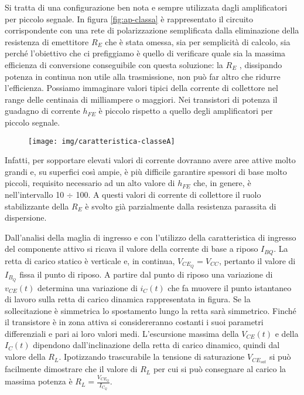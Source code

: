Si tratta di una configurazione ben nota e sempre utilizzata dagli amplificatori per piccolo segnale.
In figura \ref{fig:ap-classa} è rappresentato il circuito corrispondente con una rete di polarizzazione	semplificata dalla eliminazione della resistenza di emettitore $R_E$ che è stata omessa, sia per
semplicità di calcolo, sia perché l'obiettivo che ci prefiggiamo è quello di verificare quale sia la
massima efficienza di conversione conseguibile con questa soluzione: la $R_E$ , dissipando potenza in
continua non utile alla trasmissione, non può far altro che ridurre l'efficienza.
Possiamo immaginare valori tipici della corrente di collettore nel range delle centinaia di
milliampere o maggiori. Nei transistori di potenza il guadagno di corrente $h_{FE}$ è piccolo rispetto a quello degli amplificatori per piccolo segnale.

\begin{figure}[htb]
\centering
\texttt{[image: img/caratteristica-classeA]}
\caption{}
\label{fig:caratteristica-classea}
\end{figure}

Infatti, per sopportare elevati valori di corrente dovranno avere aree attive molto grandi e, su superfici così ampie, è più difficile garantire spessori di base molto piccoli, requisito necessario ad un alto valore di $h_{FE}$ che, in genere, è nell'intervallo 10 $\div$ 100. A questi valori di corrente di collettore il ruolo stabilizzante della $R_E$ è svolto già parzialmente dalla resistenza parassita di dispersione.

Dall'analisi della maglia di ingresso e con l'utilizzo della caratteristica di ingresso del componente attivo si ricava il valore della corrente di base a riposo $I_{BQ}$.
La retta di carico statico è verticale e, in continua, $V_{CE_Q} = V_{CC}$, pertanto il valore di $I_{B_Q}$ fissa il punto di riposo.
A partire dal punto di riposo una variazione di $v_{CE}(t)$ determina una variazione di $i_C (t)$ che fa
muovere il punto istantaneo di lavoro sulla retta di carico dinamica rappresentata in figura. Se la sollecitazione è simmetrica lo spostamento lungo la retta sarà simmetrico. Finché il transistore è in zona attiva si considereranno costanti i suoi parametri differenziali e pari ai loro valori medi.
L'escursione massima della $V_{CE} (t)$ e della $I_C(t)$ dipendono dall'inclinazione della retta di carico
dinamico, quindi dal valore della $R_L$. Ipotizzando trascurabile la tensione di saturazione $V_{CE_{sat}}$ si può facilmente dimostrare che il valore di $R_L$ per cui si può consegnare al carico la massima potenza è $R_L = \frac{V_{CE_Q}}{I_{C_Q}}$.

